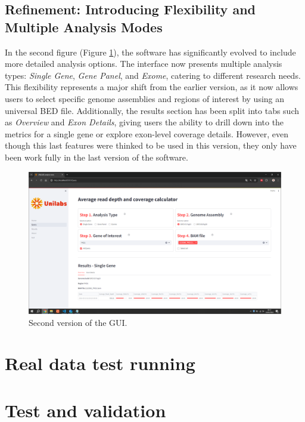 \subsection{Refinement: Introducing Flexibility and Multiple Analysis Modes}

In the second figure (Figure \ref{fig:v2}), the software has significantly evolved to include more detailed analysis options. The interface now presents multiple analysis types: \textit{Single Gene}, \textit{Gene Panel}, and \textit{Exome}, catering to different research needs. This flexibility represents a major shift from the earlier version, as it now allows users to select specific genome assemblies and regions of interest by using an universal BED file. Additionally, the results section has been split into tabs such as \textit{Overview} and \textit{Exon Details}, giving users the ability to drill down into the metrics for a single gene or explore exon-level coverage details. However, even though this last features were thinked to be used in this version, they only have been work fully in the last version of the software. 

\begin{figure}[H]
    \centering
    \includegraphics[width=1\textwidth]{figs/v2.png}
    \caption{Second version of the GUI.} 
    \label{fig:v2}
\end{figure}






\section{Real data test running}
\section{Test and validation}

